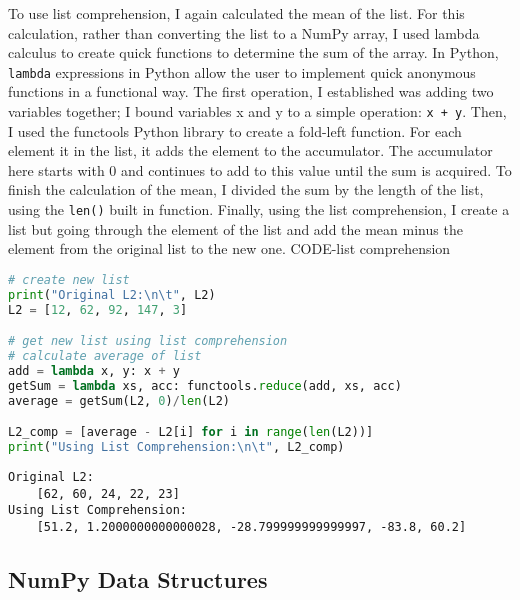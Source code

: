 \documentclass[journal]{IEEEtran}
\begin{document}
To use list comprehension, I again calculated the mean of the list. For this calculation, rather than converting the list to a NumPy array, I used lambda calculus to create quick functions to determine the sum of the array. In Python, \lstinline{lambda} expressions in Python allow the user to implement quick anonymous functions in a functional way. The first operation, I established was adding two variables together; I bound variables x and y to a simple operation: \lstinline{x + y}. Then, I used the functools Python library to create a fold-left function. For each element it in the list, it adds the element to the accumulator. The accumulator here starts with 0 and continues to add to this value until the sum is acquired. To finish the calculation of the mean, I divided the sum by the length of the list, using the \lstinline{len()} built in function. Finally, using the list comprehension, I create a list but going through the element of the list and add the mean minus the element from the original list to the new one. 
{CODE-list comprehension}
\begin{lstlisting}[language=Python, caption=Modifying Lists with List Comprehension]
# create new list 
print("Original L2:\n\t", L2)
L2 = [12, 62, 92, 147, 3]

# get new list using list comprehension 
# calculate average of list 
add = lambda x, y: x + y
getSum = lambda xs, acc: functools.reduce(add, xs, acc)
average = getSum(L2, 0)/len(L2)

L2_comp = [average - L2[i] for i in range(len(L2))]
print("Using List Comprehension:\n\t", L2_comp)
\end{lstlisting}

\begin{lstlisting}[caption={Output using List Comprehension}]
Original L2:
	[62, 60, 24, 22, 23]
Using List Comprehension:
	[51.2, 1.2000000000000028, -28.799999999999997, -83.8, 60.2]
\end{lstlisting}

\subsection{NumPy Data Structures}
\end{document}

